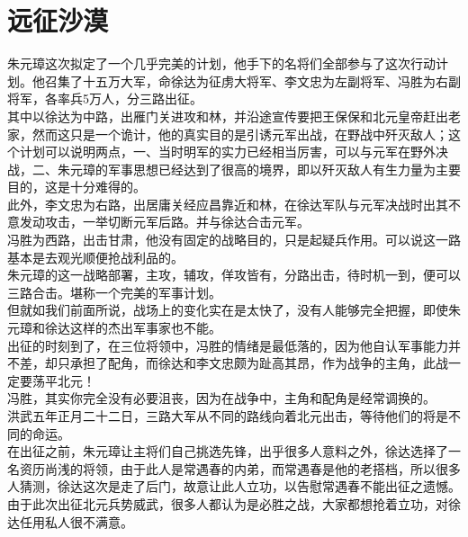 \section{远征沙漠}
\ifnum{}
	\begin{multicols}{\theparacolNo}
\fi
朱元璋这次拟定了一个几乎完美的计划，他手下的名将们全部参与了这次行动计划。他召集了十五万大军，命徐达为征虏大将军、李文忠为左副将军、冯胜为右副将军，各率兵5万人，分三路出征。\\

其中以徐达为中路，出雁门关进攻和林，并沿途宣传要把王保保和北元皇帝赶出老家，然而这只是一个诡计，他的真实目的是引诱元军出战，在野战中歼灭敌人；这个计划可以说明两点，一、当时明军的实力已经相当厉害，可以与元军在野外决战，二、朱元璋的军事思想已经达到了很高的境界，即以歼灭敌人有生力量为主要目的，这是十分难得的。\\

此外，李文忠为右路，出居庸关经应昌靠近和林，在徐达军队与元军决战时出其不意发动攻击，一举切断元军后路。并与徐达合击元军。\\

冯胜为西路，出击甘肃，他没有固定的战略目的，只是起疑兵作用。可以说这一路基本是去观光顺便抢战利品的。\\

朱元璋的这一战略部署，主攻，辅攻，佯攻皆有，分路出击，待时机一到，便可以三路合击。堪称一个完美的军事计划。\\

但就如我们前面所说，战场上的变化实在是太快了，没有人能够完全把握，即使朱元璋和徐达这样的杰出军事家也不能。\\

出征的时刻到了，在三位将领中，冯胜的情绪是最低落的，因为他自认军事能力并不差，却只承担了配角，而徐达和李文忠颇为趾高其昂，作为战争的主角，此战一定要荡平北元！\\

冯胜，其实你完全没有必要沮丧，因为在战争中，主角和配角是经常调换的。\\

洪武五年正月二十二日，三路大军从不同的路线向着北元出击，等待他们的将是不同的命运。\\

在出征之前，朱元璋让主将们自己挑选先锋，出乎很多人意料之外，徐达选择了一名资历尚浅的将领，由于此人是常遇春的内弟，而常遇春是他的老搭档，所以很多人猜测，徐达这次是走了后门，故意让此人立功，以告慰常遇春不能出征之遗憾。由于此次出征北元兵势威武，很多人都认为是必胜之战，大家都想抢着立功，对徐达任用私人很不满意。\\


\end{multicols}

